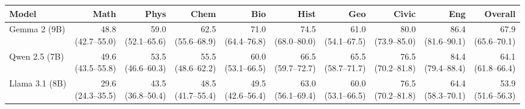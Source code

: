 \begin{tabular}{@{}lrrrrrrrrr@{}}
\toprule
Model & Math & Phys & Chem & Bio & Hist & Geo & Civic & Eng & Overall \\
\midrule
Gemma 2 (9B) & \makecell[r]{48.8 \\ \scriptsize(42.7--55.0)} & \makecell[r]{59.0 \\ \scriptsize(52.1--65.6)} & \makecell[r]{62.5 \\ \scriptsize(55.6--68.9)} & \makecell[r]{71.0 \\ \scriptsize(64.4--76.8)} & \makecell[r]{74.5 \\ \scriptsize(68.0--80.0)} & \makecell[r]{61.0 \\ \scriptsize(54.1--67.5)} & \makecell[r]{80.0 \\ \scriptsize(73.9--85.0)} & \makecell[r]{86.4 \\ \scriptsize(81.6--90.1)} & \makecell[r]{67.9 \\ \scriptsize(65.6--70.1)} \\
Qwen 2.5 (7B) & \makecell[r]{49.6 \\ \scriptsize(43.5--55.8)} & \makecell[r]{53.5 \\ \scriptsize(46.6--60.3)} & \makecell[r]{55.5 \\ \scriptsize(48.6--62.2)} & \makecell[r]{60.0 \\ \scriptsize(53.1--66.5)} & \makecell[r]{66.5 \\ \scriptsize(59.7--72.7)} & \makecell[r]{65.5 \\ \scriptsize(58.7--71.7)} & \makecell[r]{76.5 \\ \scriptsize(70.2--81.8)} & \makecell[r]{84.4 \\ \scriptsize(79.4--88.4)} & \makecell[r]{64.1 \\ \scriptsize(61.8--66.4)} \\
Llama 3.1 (8B) & \makecell[r]{29.6 \\ \scriptsize(24.3--35.5)} & \makecell[r]{43.5 \\ \scriptsize(36.8--50.4)} & \makecell[r]{48.5 \\ \scriptsize(41.7--55.4)} & \makecell[r]{49.5 \\ \scriptsize(42.6--56.4)} & \makecell[r]{63.0 \\ \scriptsize(56.1--69.4)} & \makecell[r]{60.0 \\ \scriptsize(53.1--66.5)} & \makecell[r]{76.5 \\ \scriptsize(70.2--81.8)} & \makecell[r]{64.4 \\ \scriptsize(58.3--70.1)} & \makecell[r]{53.9 \\ \scriptsize(51.6--56.3)} \\

\end{tabular}
